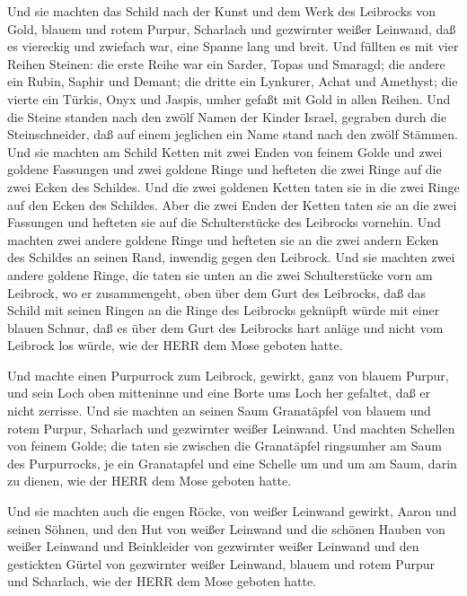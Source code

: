  Und sie machten das Schild nach der Kunst und dem Werk des
Leibrocks von Gold, blauem und rotem Purpur, Scharlach und gezwirnter
weißer Leinwand,  daß es viereckig und zwiefach war, eine
Spanne lang und breit.  Und füllten es mit vier Reihen
Steinen: die erste Reihe war ein Sarder, Topas und Smaragd;
 die andere ein Rubin, Saphir und Demant;  die
dritte ein Lynkurer, Achat und Amethyst;  die vierte ein
Türkis, Onyx und Jaspis, umher gefaßt mit Gold in allen Reihen.
 Und die Steine standen nach den zwölf Namen der Kinder
Israel, gegraben durch die Steinschneider, daß auf einem jeglichen ein
Name stand nach den zwölf Stämmen.  Und sie machten am
Schild Ketten mit zwei Enden von feinem Golde  und zwei
goldene Fassungen und zwei goldene Ringe und hefteten die zwei Ringe auf
die zwei Ecken des Schildes.  Und die zwei goldenen Ketten
taten sie in die zwei Ringe auf den Ecken des Schildes. 
Aber die zwei Enden der Ketten taten sie an die zwei Fassungen und
hefteten sie auf die Schulterstücke des Leibrocks vornehin.
 Und machten zwei andere goldene Ringe und hefteten sie an
die zwei andern Ecken des Schildes an seinen Rand, inwendig gegen den
Leibrock.  Und sie machten zwei andere goldene Ringe, die
taten sie unten an die zwei Schulterstücke vorn am Leibrock, wo er
zusammengeht, oben über dem Gurt des Leibrocks,  daß das
Schild mit seinen Ringen an die Ringe des Leibrocks geknüpft würde mit
einer blauen Schnur, daß es über dem Gurt des Leibrocks hart anläge und
nicht vom Leibrock los würde, wie der HERR dem Mose geboten hatte.

 Und machte einen Purpurrock zum Leibrock, gewirkt, ganz
von blauem Purpur,  und sein Loch oben mitteninne und eine
Borte ums Loch her gefaltet, daß er nicht zerrisse.  Und
sie machten an seinen Saum Granatäpfel von blauem und rotem Purpur,
Scharlach und gezwirnter weißer Leinwand.  Und machten
Schellen von feinem Golde; die taten sie zwischen die Granatäpfel
ringsumher am Saum des Purpurrocks,  je ein Granatapfel und
eine Schelle um und um am Saum, darin zu dienen, wie der HERR dem Mose
geboten hatte.

 Und sie machten auch die engen Röcke, von weißer Leinwand
gewirkt, Aaron und seinen Söhnen,  und den Hut von weißer
Leinwand und die schönen Hauben von weißer Leinwand und Beinkleider von
gezwirnter weißer Leinwand  und den gestickten Gürtel von
gezwirnter weißer Leinwand, blauem und rotem Purpur und Scharlach, wie
der HERR dem Mose geboten hatte.

